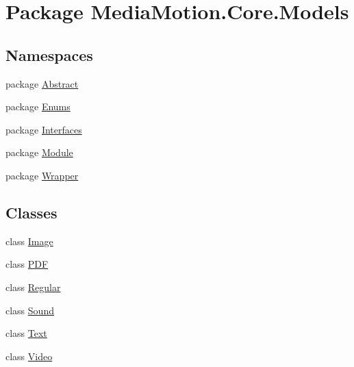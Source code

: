 \hypertarget{namespace_media_motion_1_1_core_1_1_models}{\section{Package Media\+Motion.\+Core.\+Models}
\label{namespace_media_motion_1_1_core_1_1_models}
}
\subsection*{Namespaces}
\begin{DoxyCompactItemize}
\item 
package \hyperlink{namespace_media_motion_1_1_core_1_1_models_1_1_abstract}{Abstract}
\item 
package \hyperlink{namespace_media_motion_1_1_core_1_1_models_1_1_enums}{Enums}
\item 
package \hyperlink{namespace_media_motion_1_1_core_1_1_models_1_1_interfaces}{Interfaces}
\item 
package \hyperlink{namespace_media_motion_1_1_core_1_1_models_1_1_module}{Module}
\item 
package \hyperlink{namespace_media_motion_1_1_core_1_1_models_1_1_wrapper}{Wrapper}
\end{DoxyCompactItemize}
\subsection*{Classes}
\begin{DoxyCompactItemize}
\item 
class \hyperlink{class_media_motion_1_1_core_1_1_models_1_1_image}{Image}
\item 
class \hyperlink{class_media_motion_1_1_core_1_1_models_1_1_p_d_f}{P\+D\+F}
\item 
class \hyperlink{class_media_motion_1_1_core_1_1_models_1_1_regular}{Regular}
\item 
class \hyperlink{class_media_motion_1_1_core_1_1_models_1_1_sound}{Sound}
\item 
class \hyperlink{class_media_motion_1_1_core_1_1_models_1_1_text}{Text}
\item 
class \hyperlink{class_media_motion_1_1_core_1_1_models_1_1_video}{Video}
\end{DoxyCompactItemize}
